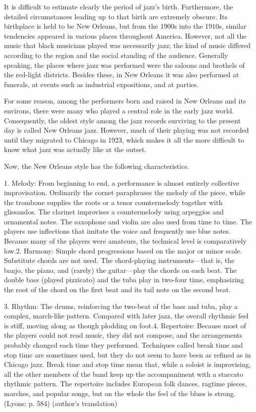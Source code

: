 It is difficult to estimate clearly the period of jazz's birth. Furthermore, the detailed circumstances leading up to that birth are extremely obscure. Its birthplace is held to be New Orleans, but from the 1900s into the 1910s, similar tendencies appeared in various places throughout America. However, not all the music that black musicians played was necessarily jazz; the kind of music differed according to the region and the social standing of the audience. Generally speaking, the places where jazz was performed were the saloons and brothels of the red-light districts. Besides these, in New Orleans it was also performed at funerals, at events such as industrial expositions, and at parties.

For some reason, among the performers born and raised in New Orleans and its environs, there were many who played a central role in the early jazz world. Consequently, the oldest style among the jazz records surviving to the present day is called New Orleans jazz. However, much of their playing was not recorded until they migrated to Chicago in 1923, which makes it all the more difficult to know what jazz was actually like at the outset.

Now, the New Orleans style has the following characteristics.

\begin{gquote}
1. Melody: From beginning to end, a performance is almost entirely collective improvisation. Ordinarily the cornet paraphrases the melody of the piece, while the trombone supplies the roots or a tenor countermelody together with glissandos. The clarinet improvises a countermelody using arpeggios and ornamental notes. The saxophone and violin are also used from time to time. The players use inflections that imitate the voice and frequently use blue notes. Because many of the players were amateurs, the technical level is comparatively low.2. Harmony: Simple chord progressions based on the major or minor scale. Substitute chords are not used. The chord-playing instruments—that is, the banjo, the piano, and (rarely) the guitar—play the chords on each beat. The double bass (played pizzicato) and the tuba play in two-four time, emphasizing the root of the chord on the first beat and its tail note on the second beat.
\end{gquote}

\begin{gquote}
3. Rhythm: The drums, reinforcing the two-beat of the bass and tuba, play a complex, march-like pattern. Compared with later jazz, the overall rhythmic feel is stiff, moving along as though plodding on foot.4. Repertoire: Because most of the players could not read music, they did not compose, and the arrangements probably changed each time they performed. Techniques called break time and stop time are sometimes used, but they do not seem to have been as refined as in Chicago jazz. Break time and stop time mean that, while a soloist is improvising, all the other members of the band keep up the accompaniment with a staccato rhythmic pattern. The repertoire includes European folk dances, ragtime pieces, marches, and popular songs, but on the whole the feel of the blues is strong. (Lyons: p. 584) (author's translation)
\end{gquote}

